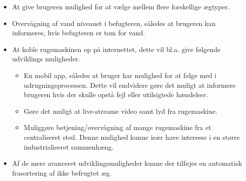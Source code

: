 \begin{itemize}
	\item At give brugeren mulighed for at vælge mellem flere forskellige ægtyper.
	\item Overvågning af vand niveauet i befugteren, således at brugeren kan informeres, hvis befugteren er tom for vand. 
	\item At koble rugemaskinen op på internettet, dette vil bl.a. give følgende udviklings muligheder.
		\begin{itemize}
			\item En mobil app, således at bruger har mulighed for at følge med i udrugningsprocessen. Dette vil endvidere gøre det muligt at informere brugeren hvis der skulle opstå fejl eller utilsigtede hændelser. 
			\space
			\item Gøre det muligt at live-streame video samt lyd fra rugemaskine.
			\item Muliggøre betjening/overvågning af mange rugemaskine fra et centraliseret sted. Denne mulighed kunne især have interesse i en større industrialiseret sammenhæng.   
		\end{itemize} 
	\item Af de mere avanceret udviklingsmuligheder kunne der tilføjes en automatisk frasortering af ikke befrugtet æg.  
\end{itemize}